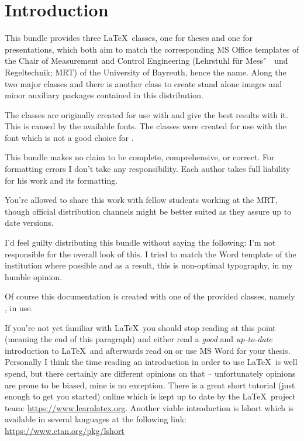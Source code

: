 \chapter{Introduction}
This bundle provides three \LaTeX\ classes, one for theses and one for
presentations, which both aim to match the corresponding MS Office templates of
the Chair of Measurement and Control Engineering (Lehrstuhl für Mess"~~und
Regeltechnik; MRT) of the University of Bayreuth, hence the name. Along the two
major classes  and  there is another class to
create stand alone images and minor auxiliary packages contained in this
distribution.

The classes are originally created for use with  and give the
best results with it. This is caused by the available fonts. The classes were
created for use with the  font which is not a good choice for
\luaxelatex*.

This bundle makes no claim to be complete, comprehensive, or correct. For
formatting errors I don't take any responsibility. Each author takes full
liability for his work and its formatting.

You're allowed to share this work with fellow students working at the MRT,
though official distribution channels might be better suited as they assure up
to date versions.

I'd feel guilty distributing this bundle without saying the following: I'm not
responsible for the overall look of this. I tried to match the Word template of
the institution where possible and as a result, this is non-optimal typography,
in my humble opinion.

Of course this documentation is created with one of the provided classes, namely
, in use.

If you're not yet familiar with \LaTeX\ you should stop reading at this point
(meaning the end of this paragraph) and either read a \emph{good} and
\emph{up-to-date} introduction to \LaTeX\ and afterwards read on or use MS Word
for your thesis. Personally I think the time reading an introduction in order to
use \LaTeX\ is well spend, but there certainly are different opinions on that --
unfortunately opinions are prone to be biased, mine is no exception. There is
a great short tutorial (just enough to get you started) online which is kept up
to date by the \LaTeX\ project team: \url{https://www.learnlatex.org}. Another
viable introduction is lshort which is available in several languages at the
following link: \url{https://www.ctan.org/pkg/lshort}

